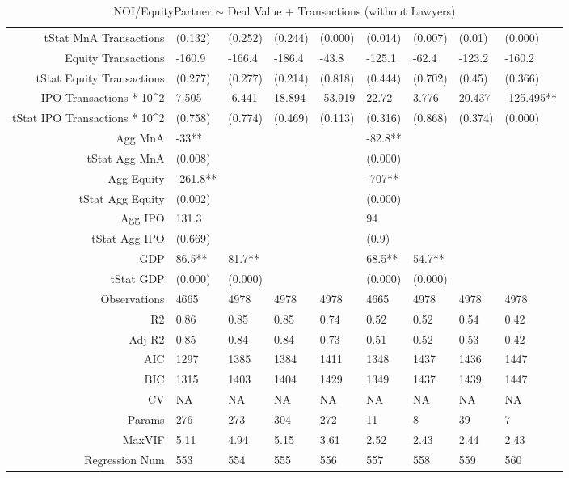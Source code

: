 \begin{table}[ht]
\begin{tabular}{rllllllll}
  tStat MnA Transactions & (0.132) & (0.252) & (0.244) & (0.000) & (0.014) & (0.007) & (0.01) & (0.000) \\ 
  Equity Transactions & -160.9 & -166.4 & -186.4 & -43.8 & -125.1 & -62.4 & -123.2 & -160.2 \\ 
  tStat Equity Transactions & (0.277) & (0.277) & (0.214) & (0.818) & (0.444) & (0.702) & (0.45) & (0.366) \\ 
  IPO Transactions * 10^2 & 7.505 & -6.441 & 18.894 & -53.919 & 22.72 & 3.776 & 20.437 & -125.495** \\ 
  tStat IPO Transactions * 10^2 & (0.758) & (0.774) & (0.469) & (0.113) & (0.316) & (0.868) & (0.374) & (0.000) \\ 
  Agg MnA & -33** &  &  &  & -82.8** &  &  &  \\ 
  tStat Agg MnA & (0.008) &  &  &  & (0.000) &  &  &  \\ 
  Agg Equity & -261.8** &  &  &  & -707** &  &  &  \\ 
  tStat Agg Equity & (0.002) &  &  &  & (0.000) &  &  &  \\ 
  Agg IPO & 131.3 &  &  &  & 94 &  &  &  \\ 
  tStat Agg IPO & (0.669) &  &  &  & (0.9) &  &  &  \\ 
  GDP & 86.5** & 81.7** &  &  & 68.5** & 54.7** &  &  \\ 
  tStat GDP & (0.000) & (0.000) &  &  & (0.000) & (0.000) &  &  \\ 
  Observations & 4665 & 4978 & 4978 & 4978 & 4665 & 4978 & 4978 & 4978 \\ 
  R2 & 0.86 & 0.85 & 0.85 & 0.74 & 0.52 & 0.52 & 0.54 & 0.42 \\ 
  Adj R2 & 0.85 & 0.84 & 0.84 & 0.73 & 0.51 & 0.52 & 0.53 & 0.42 \\ 
  AIC & 1297 & 1385 & 1384 & 1411 & 1348 & 1437 & 1436 & 1447 \\ 
  BIC & 1315 & 1403 & 1404 & 1429 & 1349 & 1437 & 1439 & 1447 \\ 
  CV & NA & NA & NA & NA & NA & NA & NA & NA \\ 
  Params & 276 & 273 & 304 & 272 & 11 & 8 & 39 & 7 \\ 
  MaxVIF & 5.11 & 4.94 & 5.15 & 3.61 & 2.52 & 2.43 & 2.44 & 2.43 \\ 
  Regression Num & 553 & 554 & 555 & 556 & 557 & 558 & 559 & 560 \\ 
   \hline
\end{tabular}
\caption{NOI/EquityPartner $\sim$ Deal Value + Transactions (without Lawyers)} 
\end{table}
